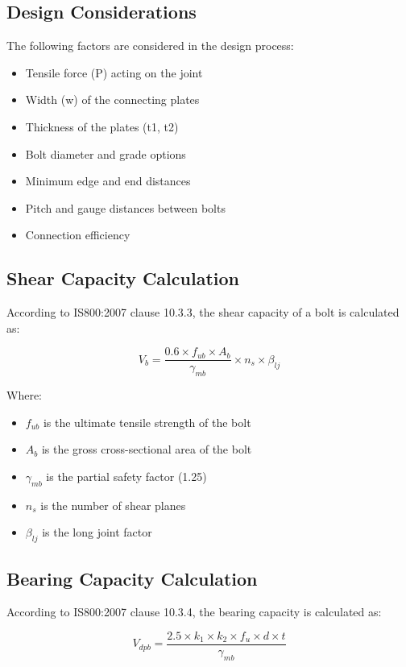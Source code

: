 \documentclass[12pt,a4paper]{article}
\begin{document}
\subsection{Design Considerations}
The following factors are considered in the design process:
\begin{itemize}
    \item Tensile force (P) acting on the joint
    \item Width (w) of the connecting plates
    \item Thickness of the plates (t1, t2)
    \item Bolt diameter and grade options
    \item Minimum edge and end distances
    \item Pitch and gauge distances between bolts
    \item Connection efficiency
\end{itemize}

\subsection{Shear Capacity Calculation}
According to IS800:2007 clause 10.3.3, the shear capacity of a bolt is calculated as:

\begin{equation}
V_b = \frac{0.6 \times f_{ub} \times A_b}{\gamma_{mb}} \times n_s \times \beta_{lj}
\end{equation}

Where:
\begin{itemize}
    \item $f_{ub}$ is the ultimate tensile strength of the bolt
    \item $A_b$ is the gross cross-sectional area of the bolt
    \item $\gamma_{mb}$ is the partial safety factor (1.25)
    \item $n_s$ is the number of shear planes
    \item $\beta_{lj}$ is the long joint factor
\end{itemize}

\subsection{Bearing Capacity Calculation}
According to IS800:2007 clause 10.3.4, the bearing capacity is calculated as:

\begin{equation}
V_{dpb} = \frac{2.5 \times k_1 \times k_2 \times f_u \times d \times t}{\gamma_{mb}}
\end{equation}
\end{document}
